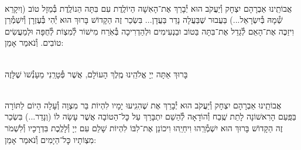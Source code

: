 \documentclass[twoside, openany, parskip=half, 11pt]{book}
\begin{document}
\begin{small}
\\
אֲבוֹתֵֽינוּ אַבְרָהָם יִצְחָק וְ֯יַעֲקֹב הוּא יְ֯בָרֵךְ אֶת־הָאִשָׁה הַיוֹלֶֽדֶת
עִם בִּתָּה הַנוֹלֶֽדֶת בְּ֯מַזָל טוֹב (וְיִקָרֵא שְׁ֯מָהּ בְּ֯יִשְׂרָאֵל...) בַּעֲבוּר שֶׁבַּעֲלָה נָדַר בַּעֲדָן... בִּשְׂכַר זֶה הַקָדוֹשׁ בָּרוּךְ הוּא יְ֯הִי בְּ֯עֶזְרָן וְ֯יִשְׁמְ֯רֵן וִיזַכֶּה אֶת־הָאֵם לְ֯גַדֵל אֶת־בִּתָּה בַּטוֹב ובַנְעִימִים וּלְהַדְרִיכָה בְּ֯אֹֽרַח מִישׁוֹר לְ֯מִצְוֹת לְ֯חֻפָּה וּלְמַעֲשִׂים טוֹבִים. וְ֯נֹאמַר אָמֵן:


\\
בָּרוּךְ אַתָּה יְיָ אֱלֹהֵֽינוּ מֶֽלֶךְ הָעוֹלָם, אֲשֶׁר פְּ֯טָרַֽנִי מֵעָנְ֯שׁוׂ שֶׁלָּזֶה

\\
אֲבוֹתֵֽינוּ אַבְרָהָם יִצְחָק וְ֯יַעֲקֹב הוּא יְ֯בָרֵךְ אֶת
שֶׁהִגִֽיעוּ יָמָיו לִהְיוֹת בַּר מִצְוָה וְ֯עָלָה הַיוֹם לַתּוֹרָה בַּפַּֽעַם הָרִאשׁוֹנָה לָתֵת שֶֽׁבַח וְ֯הוֹדָאָה לְ֯הַשֵׁם יִתְבָּרַךְ עַל כׇּל־הַטוֹבָה אֲשֶׁר עָשָׂה לוֹ (וְנָדַר...) בִּשְׂכַר זֶה הַקָדוֹשׁ בָּרוּךְ הוּא יִשְׁמְ֯רֵֽהוּ וִיחַיֵֽהוּ וִיכוֹנֵן אֶת־לִבּוֹ לִהְיוֹת שָׁלֵם עִם יְיָ וְ֯לָלֶֽכֶת בִּדְרָכָיו וְ֯לִשְׁמֹר מִצְוֹתָיו כׇּל־הַיָמִים וְ֯נֹאמַר אָמֵן:


\end{small}

\sepline

\\
\halfkaddish


\newcommand{\hagbaha}{
\instruction{הגבה:}
\firstword{וְזֹ֖את הַתּוֹרָ֑ה}\source{דברים ד}
אֲשֶׁר־שָׂ֣ם מֹשֶׁ֔ה לִפְנֵ֖י בְּ֯נֵ֥י יִשְׂרָאֵֽל׃
עַל־פִּ֥י \source{במדבר ט}יְיָ֖ בְּ֯יַד־מֹשֶֽׁה׃
עֵץ־חַיִּ֣ים \source{משלי ג} הִ֭יא לַמַּחֲזִיקִ֣ים בָּ֑הּ וְֽ֯תֹמְ֯כֶ֥יהָ מְ֯אֻשָּֽׁר׃
דְּ֯רָכֶ֥יהָ דַרְכֵי־נֹ֑עַם וְֽ֯כׇל־נְ֯תִ֖יבוֹתֶ֣יהָ שָׁלֽוֹם׃
אֹ֣רֶךְ יָ֭מִים בִּֽימִינָ֑הּ בִּ֝שְׂמֹאולָ֗הּ עֹ֣שֶׁר וְ֯כָבֽוֹד׃
יְיָ֥ \source{ישעיה מב}חָפֵ֖ץ לְ֯מַ֣עַן צִדְק֑וֹ יַגְדִּ֥יל תּוֹרָ֖ה וְ֯יַאְדִּֽיר׃

}


\newcommand{\yehalelu}{
\shatz
\begin{large}
\textbf{
יְ֯הַלְ֯ל֤וּ ׀ אֶת־שֵׁ֬ם יְיָ֗ כִּֽי־נִשְׂגָּ֣ב שְׁ֯מ֣וֹ לְ֯בַדּ֑וֹ

}
\end{large}\source{תהלים קמח}

%
\kahal
ה֝וֹד֗וֹ עַל־אֶ֥רֶץ וְ֯שָׁמָֽיִם׃ וַיָּ֤רֶם קֶ֨רֶן ׀ לְ֯עַמּ֡וֹ תְּ֯הִלָּ֤ה לְֽ֯כׇל־חֲסִידָ֗יו לִבְנֵ֣י יִ֭שְׂרָאֵל עַ֥ם קְ֯רֹב֗וֹ הַֽלְ֯לוּ־יָֽהּ׃
}
\end{document}

